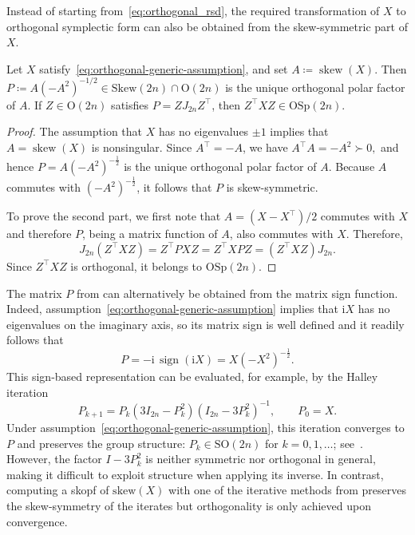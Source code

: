 \documentclass[final,onefignum,onetabnum,dvipsnames]{siamart251216}
\numberwithin{algorithm}{section}
\numberwithin{equation}{section}
\begin{document}
Instead of starting from~\eqref{eq:orthogonal_rsd}, the required transformation of $X$ to orthogonal symplectic form can also be obtained from the skew-symmetric part of $X$.

\begin{proposition}
\label{prop:orthogonal-to-symplectic}
Let $X$ satisfy~\eqref{eq:orthogonal-generic-assumption}, and set
$A\coloneq\operatorname{skew}(X)$. Then $P\coloneq A(-A^2)^{-1/2} \in\mathrm{Skew}(2n)\cap\mathrm{O}(2n)$ is the unique
orthogonal polar factor of $A$.
If $Z\in\mathrm{O}(2n)$ satisfies
$P=ZJ_{2n}Z^\top$, then
$
    Z^\top XZ\in\mathrm{OSp}(2n).
$
\end{proposition}

\begin{proof}
The assumption that $X$ has no eigenvalues $\pm1$ implies that
$A=\operatorname{skew}(X)$ is nonsingular. Since $A^\top=-A$, we have
$
    A^\top A=-A^2\succ0,
$
and hence $P=A(-A^2)^{-\frac{1}2}$ is the unique orthogonal polar factor of
$A$. Because $A$ commutes with $(-A^2)^{-\frac12}$, it follows that $P$ is
skew-symmetric.

To prove the second part, we first note that
$
    A=(X-X^{\top})/2
$
commutes with $X$ and therefore $P$, being a matrix function of
$A$, also commutes with $X$. Therefore,
\[
    J_{2n}(Z^\top XZ)
    =
    Z^\top PXZ
    =
    Z^\top XPZ
    =
    (Z^\top XZ)J_{2n}.
\]
Since $Z^\top XZ$ is orthogonal, it belongs to
$\mathrm{OSp}(2n)$.
\end{proof}

The matrix $P$ from  can alternatively be obtained from the matrix sign function.
Indeed, assumption~\eqref{eq:orthogonal-generic-assumption} implies that
$\mathrm{i}X$ has no eigenvalues on the imaginary axis, so its matrix
sign is well defined and it readily follows that 
\begin{equation}
    P
    =
    -\mathrm{i}\,\operatorname{sign}(\mathrm{i}X)
    =
    X(-X^2)^{-\frac12}. %
    \label{eq:skew_sign}
\end{equation}
This sign-based representation can be evaluated,
for example, by the Halley iteration%
\begin{equation}
    P_{k+1}
    =
    P_k(3I_{2n}-P_k^2)(I_{2n}-3P_k^2)^{-1},
    \qquad
    P_0=X.
    \label{eq:sign_iteration}
\end{equation}
Under assumption~\eqref{eq:orthogonal-generic-assumption}, this
iteration converges to $P$ and preserves the group structure:
$P_k\in\mathrm{SO}(2n)$ for $k=0,1,\ldots$; see~\cite{HMMT04}.
However, the factor $I - 3P_k^2$ is neither symmetric nor orthogonal in general, making it difficult to exploit structure when applying its inverse. In contrast, computing a skopf of $\mathrm{skew}(X)$ with one of the iterative methods from  preserves the skew-symmetry of the iterates but orthogonality is only achieved upon convergence.
\end{document}
